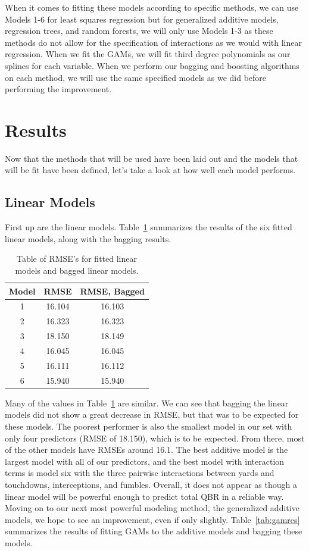 \documentclass[12pt]{article}\usepackage[]{graphicx}\usepackage[]{color}
\begin{document}
When it comes to fitting these models according to specific methods, we can use Models 1-6 for least squares regression but for generalized additive models, regression trees, and random forests, we will only use Models 1-3 as these methods do not allow for the specification of interactions as we would with linear regression. When we fit the GAMs, we will fit third degree polynomials as our splines for each variable. When we perform our bagging and boosting algorithms on each method, we will use the same specified models as we did before performing the improvement.

\section{Results}
Now that the methods that will be used have been laid out and the models that will be fit have been defined, let's take a look at how well each model performs.\\

\subsection{Linear Models}
First up are the linear models. Table~\ref{tab:lmres} summarizes the results of the six fitted linear models, along with the bagging results.\\

\begin{table}[h]
\centering
\begin{tabular}{|c|c|c|}
\hline
Model & RMSE & RMSE, Bagged \\
\hline
1 & 16.104 & 16.103 \\
\hline
2 & 16.323 & 16.323 \\
\hline
3 & 18.150 & 18.149 \\
\hline
4 & 16.045 & 16.045 \\
\hline
5 & 16.111 & 16.112 \\
\hline
6 & 15.940 & 15.940 \\
\hline
\end{tabular}
\captionsetup{font=footnotesize,labelfont=footnotesize}
\caption{\label{tab:lmres} Table of RMSE's for fitted linear models and bagged linear models.}
\end{table}

Many of the values in Table~\ref{tab:lmres} are similar. We can see that bagging the linear models did not show a great decrease in RMSE, but that was to be expected for these models. The poorest performer is also the smallest model in our set with only four predictors (RMSE of 18.150), which is to be expected. From there, most of the other models have RMSEs around 16.1. The best additive model is the largest model with all of our predictors, and the best model with interaction terms is model six with the three pairwise interactions between yards and touchdowns, interceptions, and fumbles. Overall, it does not appear as though a linear model will be powerful enough to predict total QBR in a reliable way. Moving on to our next most powerful modeling method, the generalized additive models, we hope to see an improvement, even if only slightly. Table~\ref{tab:gamres} summarizes the results of fitting GAMs to the additive models and bagging these models.
\end{document}
